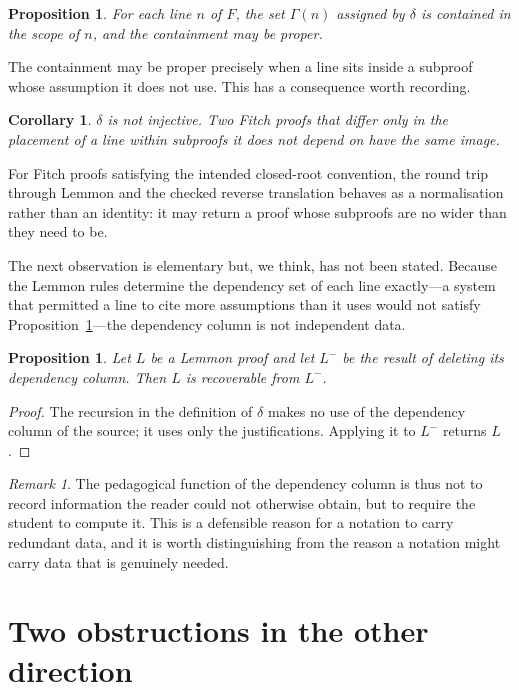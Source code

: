\documentclass[11pt]{article}
\theoremstyle{plain}
\newtheorem{proposition}[theorem]{Proposition}
\newtheorem{corollary}[theorem]{Corollary}
\theoremstyle{definition}
\theoremstyle{remark}
\newtheorem{remark}[theorem]{Remark}
\begin{document}
\begin{proposition}\label{prop:minimal}
For each line $n$ of $F$, the set $\Gamma(n)$ assigned by $\delta$ is
contained in the scope of $n$, and the containment may be proper.
\end{proposition}

The containment may be proper precisely when a line sits inside a subproof
whose assumption it does not use. This has a consequence worth recording.

\begin{corollary}\label{cor:notinjective}
$\delta$ is not injective. Two Fitch proofs that differ only in the placement
of a line within subproofs it does not depend on have the same image.
\end{corollary}

For Fitch proofs satisfying the intended closed-root convention, the round
trip through Lemmon and the checked reverse translation behaves as a
normalisation rather than an identity: it may return a proof whose subproofs
are no wider than they need to be.

The next observation is elementary but, we think, has not been stated. Because
the Lemmon rules determine the dependency set of each line exactly---a system
that permitted a line to cite more assumptions than it uses would not satisfy
Proposition~\ref{prop:minimal}---the dependency column is not independent
data.

\begin{proposition}\label{prop:redundant}
Let $L$ be a Lemmon proof and let $L^{-}$ be the result of deleting its
dependency column. Then $L$ is recoverable from $L^{-}$.
\end{proposition}

\begin{proof}
The recursion in the definition of $\delta$ makes no use of the dependency
column of the source; it uses only the justifications. Applying it to $L^{-}$
returns $L$.
\end{proof}

\begin{remark}
The pedagogical function of the dependency column is thus not to record
information the reader could not otherwise obtain, but to require the student
to compute it. This is a defensible reason for a notation to carry redundant
data, and it is worth distinguishing from the reason a notation might carry
data that is genuinely needed.
\end{remark}

\section{Two obstructions in the other direction}\label{sec:obstructions}
\end{document}
